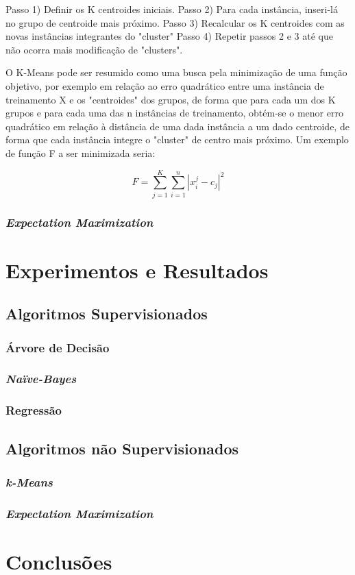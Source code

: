 \documentclass{article}
\begin{document}
	Passo 1) Definir os K centroides iniciais.
	Passo 2) Para cada instância, inseri-lá no grupo de centroide mais próximo.
	Passo 3) Recalcular os K centroides com as novas instâncias integrantes do "cluster"
	Passo 4) Repetir passos 2 e 3 até que não ocorra mais modificação de "clusters".

O K-Means pode ser resumido como uma busca pela minimização de uma função objetivo, por exemplo em relação ao erro quadrático entre uma instância de treinamento X e os "centroides" dos grupos, de forma que para cada um dos K grupos e para cada uma das n instâncias de treinamento, obtém-se o menor erro quadrático em relação à distância de uma dada instância a um dado centroide, de forma que cada instância integre o "cluster" de centro mais próximo. Um exemplo de função F a ser minimizada seria:

\begin{equation}
F = \sum_{j=1}^{K} \sum_{i=1}^{n} {|{x}_{i}^{j} - c_{j}|}^2
\end{equation}

\subsubsection{{\b \it Expectation Maximization}}

\section{Experimentos e Resultados}

\subsection{Algoritmos Supervisionados}

\subsubsection{Árvore de Decisão}

\subsubsection{{\b \it Naïve-Bayes}}

\subsubsection{Regressão}

\subsection{Algoritmos não Supervisionados}

\subsubsection{{\b \it k-Means}}

\subsubsection{{\b \it Expectation Maximization}}

\section{Conclusões}


\end{document}
